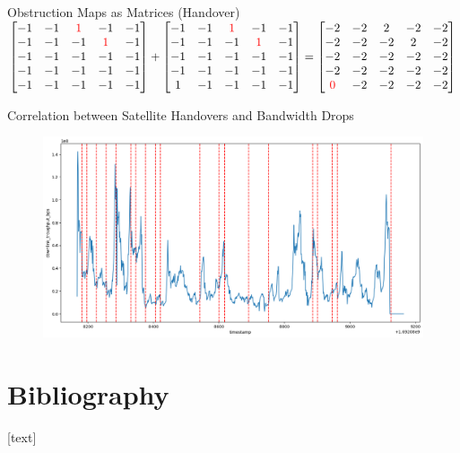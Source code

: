 \documentclass[NET,english,beameralt]{tumbeamer}
\begin{document}
\begin{frame}{Obstruction Maps as Matrices (Handover)}
    $\begin{bmatrix}
        -1 & -1 & \color{red}1 &           -1 & -1 \\
        -1 & -1 &           -1 & \color{red}1 & -1 \\
        -1 & -1 &           -1 &           -1 & -1 \\
        -1 & -1 &           -1 &           -1 & -1 \\
        -1 & -1 &           -1 &           -1 & -1 \\
    \end{bmatrix}
    +
    \begin{bmatrix}
        -1 & -1 & \color{red}1 &           -1 & -1 \\
        -1 & -1 &           -1 & \color{red}1 & -1 \\
        -1 & -1 &           -1 &           -1 & -1 \\
        -1 & -1 &           -1 &           -1 & -1 \\
        1 & -1 &            -1 &           -1 & -1 \\
    \end{bmatrix}
    =
    \begin{bmatrix}
        -2 & -2 & 2 & -2 & -2 \\
        -2 & -2 & -2 & 2 & -2 \\
        -2 & -2 & -2 & -2 & -2 \\
        -2 & -2 & -2 & -2 & -2 \\
        \color{red}0 & -2 & -2 & -2 & -2 \\
    \end{bmatrix}$
\end{frame}

\begin{frame}[fragile]{Correlation between Satellite Handovers and Bandwidth Drops}
    \begin{figure}
        \includegraphics[width=0.8\columnwidth]{pics/correlation_handovers_bw.png}
    \end{figure}
\end{frame}

\section{Bibliography}
\begin{frame}[allowframebreaks]
    
    [text]
    \footnotesize
    
\end{frame}
\end{document}
